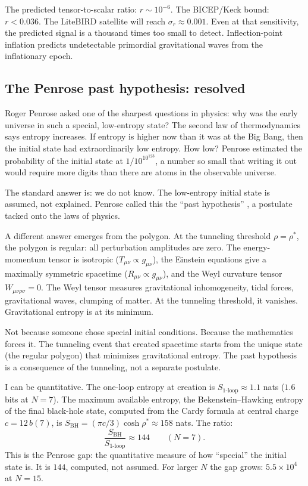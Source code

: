 The predicted tensor-to-scalar ratio: $r \sim 10^{-6}$. The BICEP/Keck
bound: $r < 0.036$. The LiteBIRD satellite will reach
$\sigma_r \approx 0.001$. Even at that sensitivity, the predicted
signal is a thousand times too small to detect. Inflection-point
inflation predicts undetectable primordial gravitational waves from the
inflationary epoch.

\subsection*{The Penrose past hypothesis: resolved}

Roger Penrose asked one of the sharpest questions in physics: why was
the early universe in such a special, low-entropy state? The second
law of thermodynamics says entropy increases. If entropy is higher now
than it was at the Big Bang, then the initial state had extraordinarily
low entropy. How low? Penrose estimated the probability of the initial
state at $1/10^{10^{123}}$, a number so small that writing it out
would require more digits than there are atoms in the observable
universe.

The standard answer is: we do not know. The low-entropy initial state
is assumed, not explained. Penrose called this the ``past hypothesis''
, a postulate tacked onto the laws of physics.

A different answer emerges from the polygon. At the tunneling threshold
$\rho = \rho^*$, the polygon is regular: all perturbation amplitudes
are zero. The energy-momentum tensor is isotropic
($T_{\mu\nu} \propto g_{\mu\nu}$), the Einstein equations give a
maximally symmetric spacetime
($R_{\mu\nu} \propto g_{\mu\nu}$), and the Weyl curvature tensor
$W_{\mu\nu\rho\sigma} = 0$. The Weyl tensor measures
gravitational inhomogeneity, tidal forces, gravitational waves,
clumping of matter. At the tunneling threshold, it vanishes.
Gravitational entropy is at its minimum.

Not because someone chose special initial conditions. Because the
mathematics forces it. The tunneling event that created spacetime
starts from the unique state (the regular polygon) that minimizes
gravitational entropy. The past hypothesis is a consequence of the
tunneling, not a separate postulate.

I can be quantitative. The one-loop entropy at creation is
$S_{\mathrm{1\text{-}loop}} \approx 1.1$ nats ($1.6$ bits at
$N = 7$). The maximum available entropy, the Bekenstein--Hawking
entropy of the final black-hole state, computed from the Cardy
formula at central charge $c = 12\,b(7)$, is
$S_{\mathrm{BH}} = (\pi c/3)\cosh\rho^* \approx 158$ nats. The
ratio:
\[
  \frac{S_{\mathrm{BH}}}{S_{\mathrm{1\text{-}loop}}} \approx 144
  \qquad (N = 7).
\]
This is the Penrose gap: the quantitative measure of how ``special''
the initial state is. It is $144$, computed, not assumed. For larger
$N$ the gap grows: $5.5 \times 10^4$ at $N = 15$.

